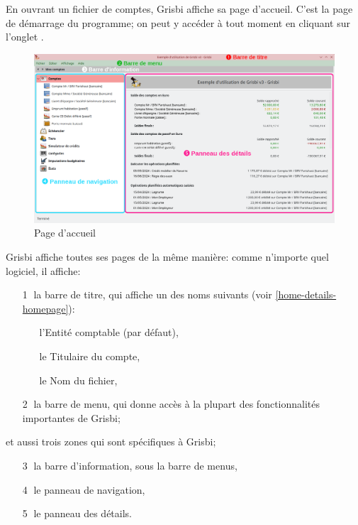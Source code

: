 En ouvrant un fichier de comptes, Grisbi affiche sa page d'accueil.
C'est la page de démarrage du programme; on peut y accéder à tout moment en cliquant sur l'onglet . 


\begin{figure}[htbp]			%
\begin{center}
\includegraphics[width=1\textwidth]{image/screenshot/home_3.0.png}
\end{center}
\caption{Page d'accueil}		%
\label{home_3.0}
\end{figure}


Grisbi affiche toutes ses pages de la même manière: comme n'importe quel logiciel, il affiche:%

\begin{itemize}%
	\item[\large\textcircled{\small 1}] la barre de titre, qui affiche un des noms suivants (voir \vref{home-details-homepage}):%
		\begin{itemize}
			\item[\textopenbullet] l'Entité comptable (par défaut),
			\item[\textopenbullet] le Titulaire du compte,
			\item[\textopenbullet] le Nom du fichier,
		\end{itemize}
	\item[\large\textcircled{\small 2}] la barre de menu, qui donne accès à la plupart des fonctionnalités importantes de Grisbi;
\end{itemize}
et aussi trois zones qui sont spécifiques à Grisbi;
\begin{itemize}%
	\item[\large\textcircled{\small 3}] la barre d'information, sous la barre de menus,
	\item[\large\textcircled{\small 4}] le panneau de navigation,
	\item[\large\textcircled{\small 5}] le panneau des détails.
\end{itemize}


